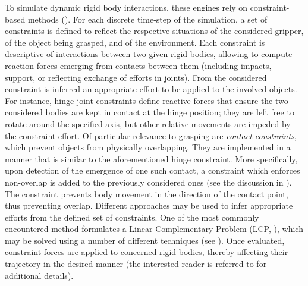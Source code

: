 To simulate dynamic rigid body interactions, these engines rely on constraint-based methods (\cite{baraff1993non}). For each discrete time-step of the simulation, a set of constraints is defined to reflect the respective situations of the considered gripper, of the object being grasped, and of the environment. Each constraint is descriptive of interactions between two given rigid bodies, allowing to compute reaction forces emerging from contacts between them (including impacts, support, or reflecting exchange of efforts in joints). From the considered constraint is inferred an appropriate effort to be applied to the involved objects. For instance, hinge joint constraints define reactive forces that ensure the two considered bodies are kept in contact at the hinge position; they are left free to rotate around the specified axis, but other relative movements are impeded by the constraint effort. Of particular relevance to grasping are \emph{contact constraints}, which prevent objects from physically overlapping. They are implemented in a manner that is similar to the aforementioned hinge constraint. More specifically, upon detection of the emergence of one such contact, a constraint which enforces non-overlap is added to the previously considered ones (see the discussion in \cite{baraff1993non}). The constraint prevents body movement in the direction of the contact point, thus preventing overlap. Different approaches may be used to infer appropriate efforts from the defined set of constraints. One of the most commonly encountered method formulates a Linear Complementary Problem (LCP, \cite{cottle2009}), which may be solved using a number of different techniques (see \cite{anitescu_time_stepping_lcp_solver,lemke_lcp_solver}). Once evaluated, constraint forces are applied to concerned rigid bodies, thereby affecting their trajectory in the desired manner (the interested reader is referred to \cite{extending_ode_robots} for additional details).


